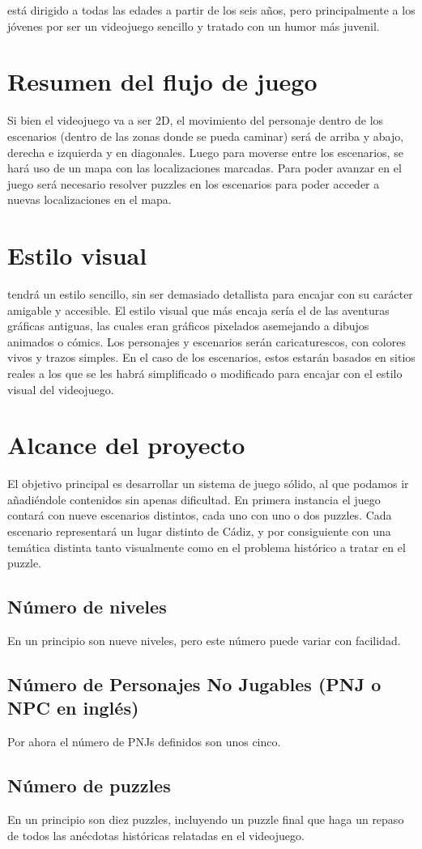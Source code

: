         \nombrejuego está dirigido a todas las edades a partir de los seis años, pero principalmente a los jóvenes por ser un videojuego sencillo y tratado con un humor más juvenil. 
        
    \section{Resumen del flujo de juego}%
        Si bien el videojuego va a ser 2D, el movimiento del personaje dentro de los escenarios (dentro de las zonas donde se pueda caminar) será de arriba y abajo, derecha e izquierda y en diagonales. Luego para moverse entre los escenarios, se hará uso de un mapa con las localizaciones marcadas. Para poder avanzar en el juego será necesario resolver puzzles en los escenarios para poder acceder a nuevas localizaciones en el mapa.
        
    \section{Estilo visual}
    \nombrejuego tendrá un estilo sencillo, sin ser demasiado detallista para encajar con su carácter amigable y accesible. El estilo visual que más encaja sería el de las aventuras gráficas antiguas, las cuales eran gráficos pixelados asemejando a dibujos animados o cómics. Los personajes y escenarios serán caricaturescos, con colores vivos y trazos simples. En el caso de los escenarios, estos estarán basados en sitios reales a los que se les habrá simplificado o modificado para encajar con el estilo visual del videojuego.
        
    \section{Alcance del proyecto}%
    El objetivo principal es desarrollar un sistema de juego sólido, al que podamos ir añadiéndole contenidos sin apenas dificultad. En primera instancia el juego contará con nueve escenarios distintos, cada uno con uno o dos puzzles. Cada escenario representará un lugar distinto de Cádiz, y por consiguiente con una temática distinta tanto visualmente como en el problema histórico a tratar en el puzzle.
    
        \subsection{Número de niveles}
        En un principio son nueve niveles, pero este número puede variar con facilidad.
        
        \subsection{Número de Personajes No Jugables (PNJ o NPC en inglés)}
        Por ahora el número de PNJs definidos son unos cinco.
        
        \subsection{Número de puzzles}
        En un principio son diez puzzles, incluyendo un puzzle final que haga un repaso de todos las anécdotas históricas relatadas en el videojuego.
